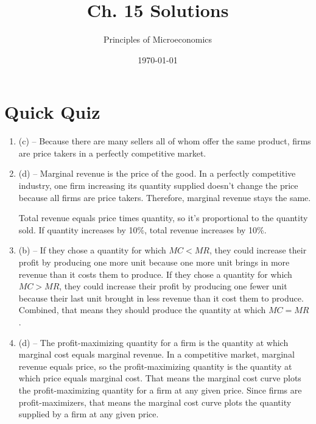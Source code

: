 \documentclass{article}
\title{Ch. 15 Solutions}
\author{Principles of Microeconomics}
\date{\today}
\begin{document}
\maketitle

\section*{Quick Quiz}

\begin{enumerate}

\item (c) -- Because there are many sellers all of whom offer the same product, firms are price takers in a perfectly competitive market.

\item (d) -- Marginal revenue is the price of the good. In a perfectly competitive industry, one firm increasing its quantity supplied doesn't change the price because all firms are price takers. Therefore, marginal revenue stays the same.

Total revenue equals price times quantity, so it's proportional to the quantity sold. If quantity increases by 10\%, total revenue increases by 10\%.

\item (b) -- If they chose a quantity for which $MC < MR$, they could increase their profit by producing one more unit because one more unit brings in more revenue than it costs them to produce. If they chose a quantity for which $MC > MR$, they could increase their profit by producing one fewer unit because their last unit brought in less revenue than it cost them to produce. Combined, that means they should produce the quantity at which $MC = MR$.

\item (d) -- The profit-maximizing quantity for a firm is the quantity at which marginal cost equals marginal revenue. In a competitive market, marginal revenue equals price, so the profit-maximizing quantity is the quantity at which price equals marginal cost. That means the marginal cost curve plots the profit-maximizing quantity for a firm at any given price. Since firms are profit-maximizers, that means the marginal cost curve plots the quantity supplied by a firm at any given price.


\end{enumerate}
\end{document}
